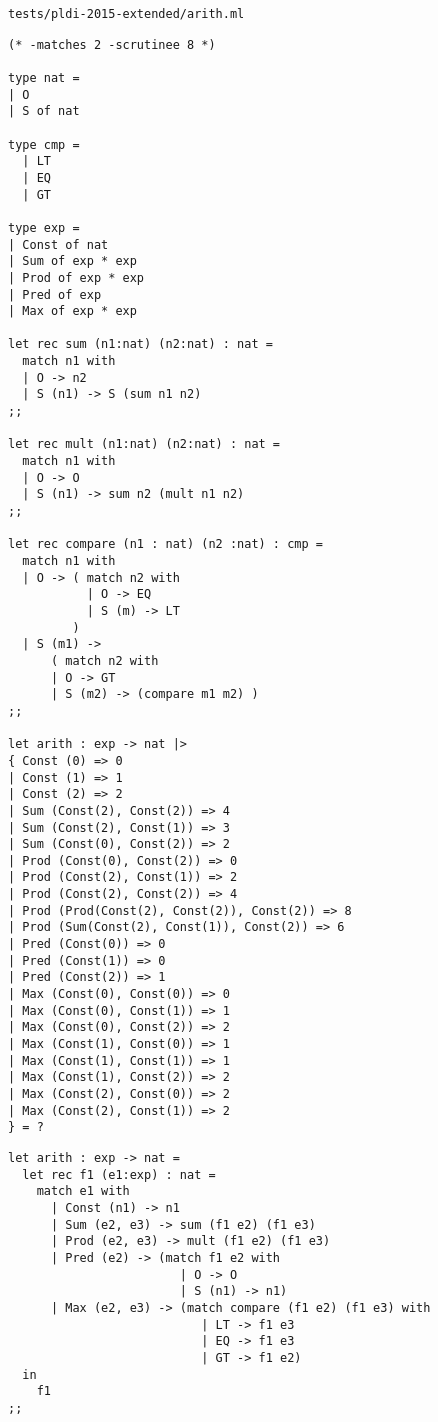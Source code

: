 \noindent\large\texttt{tests/pldi-2015-extended/arith.ml}
\begin{verbatim}
(* -matches 2 -scrutinee 8 *)

type nat =
| O
| S of nat

type cmp =
  | LT
  | EQ
  | GT

type exp =
| Const of nat
| Sum of exp * exp
| Prod of exp * exp
| Pred of exp
| Max of exp * exp 
       
let rec sum (n1:nat) (n2:nat) : nat =
  match n1 with
  | O -> n2
  | S (n1) -> S (sum n1 n2)
;;

let rec mult (n1:nat) (n2:nat) : nat =
  match n1 with
  | O -> O
  | S (n1) -> sum n2 (mult n1 n2)
;;

let rec compare (n1 : nat) (n2 :nat) : cmp =
  match n1 with
  | O -> ( match n2 with 
           | O -> EQ
           | S (m) -> LT
         )
  | S (m1) -> 
      ( match n2 with
      | O -> GT
      | S (m2) -> (compare m1 m2) )
;;

let arith : exp -> nat |>
{ Const (0) => 0
| Const (1) => 1                     
| Const (2) => 2
| Sum (Const(2), Const(2)) => 4
| Sum (Const(2), Const(1)) => 3
| Sum (Const(0), Const(2)) => 2
| Prod (Const(0), Const(2)) => 0
| Prod (Const(2), Const(1)) => 2
| Prod (Const(2), Const(2)) => 4
| Prod (Prod(Const(2), Const(2)), Const(2)) => 8
| Prod (Sum(Const(2), Const(1)), Const(2)) => 6
| Pred (Const(0)) => 0
| Pred (Const(1)) => 0
| Pred (Const(2)) => 1
| Max (Const(0), Const(0)) => 0
| Max (Const(0), Const(1)) => 1
| Max (Const(0), Const(2)) => 2
| Max (Const(1), Const(0)) => 1
| Max (Const(1), Const(1)) => 1
| Max (Const(1), Const(2)) => 2
| Max (Const(2), Const(0)) => 2  
| Max (Const(2), Const(1)) => 2
} = ?
\end{verbatim}

\begin{verbatim}
let arith : exp -> nat =
  let rec f1 (e1:exp) : nat =
    match e1 with
      | Const (n1) -> n1
      | Sum (e2, e3) -> sum (f1 e2) (f1 e3)
      | Prod (e2, e3) -> mult (f1 e2) (f1 e3)
      | Pred (e2) -> (match f1 e2 with
                        | O -> O
                        | S (n1) -> n1)
      | Max (e2, e3) -> (match compare (f1 e2) (f1 e3) with
                           | LT -> f1 e3
                           | EQ -> f1 e3
                           | GT -> f1 e2)
  in
    f1
;;
\end{verbatim}

